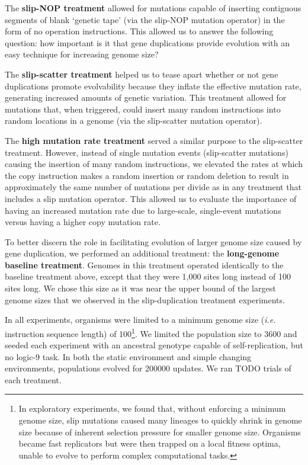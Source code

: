 The \textbf{slip-NOP treatment} allowed for mutations capable of inserting contiguous segments of blank `genetic tape' (via the slip-NOP mutation operator) in the form of no operation instructions. This allowed us to answer the following question: how important is it that gene duplications provide evolution with an easy technique for increasing genome size?

The \textbf{slip-scatter treatment} helped us to tease apart whether or not gene duplications promote evolvability because they inflate the effective mutation rate, generating increased amounts of genetic variation. This treatment allowed for mutations that, when triggered, could insert many random instructions into random locations in a genome (via the slip-scatter mutation operator).

The \textbf{high mutation rate treatment} served a similar purpose to the slip-scatter treatment. However, instead of single mutation events (slip-scatter mutations) causing the insertion of many random instructions, we elevated the rates at which the copy instruction makes a random insertion or random deletion to result in approximately the same number of mutations per divide as in any treatment that includes a slip mutation operator. This allowed us to evaluate the importance of having an increased mutation rate due to large-scale, single-event mutations versus having a higher copy mutation rate.

To better discern the role in facilitating evolution of larger genome size caused by gene duplication, we performed an additional treatment: the \textbf{long-genome baseline treatment}.
Genomes in this treatment operated identically to the baseline treatment above, except that they were 1,000 sites long instead of 100 sites long.
We chose this size as it was near the upper bound of the largest genome sizes that we observed in the slip-duplication treatment experiments.

In all experiments, organisms were limited to a minimum genome size (\textit{i.e.} instruction sequence length) of 100\footnote{
In exploratory experiments, we found that, without enforcing a minimum genome size, slip mutations caused many lineages to quickly shrink in genome size because of inherent selection pressure for smaller genome size. Organisms became fast replicators but were then trapped on a local fitness optima, unable to evolve to perform complex computational tasks.
}.
We limited the population size to 3600 and seeded each experiment with an ancestral genotype capable of self-replication, but no logic-9 task.
In both the static environment and simple changing environments, populations evolved for 200000 updates.
We ran TODO trials of each treatment.

